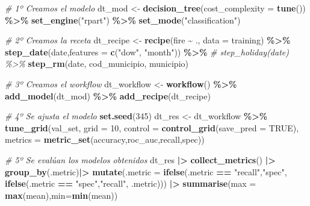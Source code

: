 \documentclass[12pt,a4paper,]{book}
\newenvironment{Shaded}{\begin{snugshade}}{\end{snugshade}}
\newcommand{\AttributeTok}[1]{\textcolor[rgb]{0.13,0.29,0.53}{#1}}
\newcommand{\CommentTok}[1]{\textcolor[rgb]{0.56,0.35,0.01}{\textit{#1}}}
\newcommand{\ConstantTok}[1]{\textcolor[rgb]{0.56,0.35,0.01}{#1}}
\newcommand{\DecValTok}[1]{\textcolor[rgb]{0.00,0.00,0.81}{#1}}
\newcommand{\FunctionTok}[1]{\textcolor[rgb]{0.13,0.29,0.53}{\textbf{#1}}}
\newcommand{\NormalTok}[1]{#1}
\newcommand{\OtherTok}[1]{\textcolor[rgb]{0.56,0.35,0.01}{#1}}
\newcommand{\SpecialCharTok}[1]{\textcolor[rgb]{0.81,0.36,0.00}{\textbf{#1}}}
\newcommand{\StringTok}[1]{\textcolor[rgb]{0.31,0.60,0.02}{#1}}
\numberwithin{dummy}{section}
\theoremstyle{ocrenumbox}
\theoremstyle{blacknumex}
\theoremstyle{blacknumbox}
\theoremstyle{ocrenum}
\theoremstyle{ocrenum}
\begin{document}
\begin{Shaded}
\begin{Highlighting}[]
\CommentTok{\# 1º Creamos el modelo}
\NormalTok{dt\_mod }\OtherTok{\textless{}{-}} 
  \FunctionTok{decision\_tree}\NormalTok{(}\AttributeTok{cost\_complexity =} \FunctionTok{tune}\NormalTok{()) }\SpecialCharTok{\%\textgreater{}\%} 
  \FunctionTok{set\_engine}\NormalTok{(}\StringTok{"rpart"}\NormalTok{) }\SpecialCharTok{\%\textgreater{}\%} 
  \FunctionTok{set\_mode}\NormalTok{(}\StringTok{"classification"}\NormalTok{)  }

\CommentTok{\# 2º Creamos la receta}
\NormalTok{dt\_recipe }\OtherTok{\textless{}{-}} 
  \FunctionTok{recipe}\NormalTok{(fire }\SpecialCharTok{\textasciitilde{}}\NormalTok{ ., }\AttributeTok{data =}\NormalTok{ training) }\SpecialCharTok{\%\textgreater{}\%} 
  \FunctionTok{step\_date}\NormalTok{(date,}\AttributeTok{features =} \FunctionTok{c}\NormalTok{(}\StringTok{"dow"}\NormalTok{, }\StringTok{"month"}\NormalTok{)) }\SpecialCharTok{\%\textgreater{}\%} 
  \CommentTok{\# step\_holiday(date) \%\textgreater{}\% }
  \FunctionTok{step\_rm}\NormalTok{(date, cod\_municipio, municipio) }

\CommentTok{\# 3º Creamos el workflow}
\NormalTok{dt\_workflow }\OtherTok{\textless{}{-}} 
  \FunctionTok{workflow}\NormalTok{() }\SpecialCharTok{\%\textgreater{}\%} 
  \FunctionTok{add\_model}\NormalTok{(dt\_mod) }\SpecialCharTok{\%\textgreater{}\%} 
  \FunctionTok{add\_recipe}\NormalTok{(dt\_recipe)}

\CommentTok{\# 4º Se ajusta el modelo }
\FunctionTok{set.seed}\NormalTok{(}\DecValTok{345}\NormalTok{)}
\NormalTok{dt\_res }\OtherTok{\textless{}{-}} 
\NormalTok{  dt\_workflow }\SpecialCharTok{\%\textgreater{}\%} 
  \FunctionTok{tune\_grid}\NormalTok{(val\_set,}
            \AttributeTok{grid =} \DecValTok{10}\NormalTok{,}
            \AttributeTok{control =} \FunctionTok{control\_grid}\NormalTok{(}\AttributeTok{save\_pred =} \ConstantTok{TRUE}\NormalTok{),}
            \AttributeTok{metrics =} \FunctionTok{metric\_set}\NormalTok{(accuracy,roc\_auc,recall,spec))}

\CommentTok{\# 5º Se evalúan los modelos obtenidos}
\NormalTok{dt\_res }\SpecialCharTok{|\textgreater{}} 
  \FunctionTok{collect\_metrics}\NormalTok{() }\SpecialCharTok{|\textgreater{}} 
  \FunctionTok{group\_by}\NormalTok{(.metric)}\SpecialCharTok{|\textgreater{}} 
  \FunctionTok{mutate}\NormalTok{(}\AttributeTok{.metric =} \FunctionTok{ifelse}\NormalTok{(.metric }\SpecialCharTok{==} \StringTok{"recall"}\NormalTok{,}\StringTok{"spec"}\NormalTok{,}
                          \FunctionTok{ifelse}\NormalTok{(.metric }\SpecialCharTok{==} \StringTok{"spec"}\NormalTok{,}\StringTok{"recall"}\NormalTok{,}
\NormalTok{                                 .metric))) }\SpecialCharTok{|\textgreater{}} 
  \FunctionTok{summarise}\NormalTok{(}\AttributeTok{max =} \FunctionTok{max}\NormalTok{(mean),}\AttributeTok{min=}\FunctionTok{min}\NormalTok{(mean))}


\end{Highlighting}
\end{Shaded}
\end{document}
